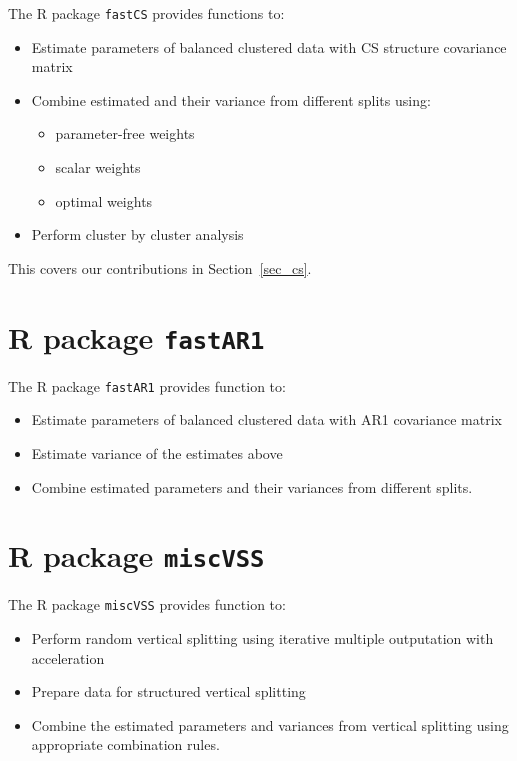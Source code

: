 \documentclass[11pt,a5paper,twoside]{book}
\begin{document}
The R package {\tt{fastCS}} provides functions to:

\begin{itemize}
\item Estimate parameters of balanced clustered data with CS structure covariance matrix 
\item Combine estimated and their variance from different splits using:
\vspace{-\topsep}
\begin{itemize}
\item parameter-free weights
\item scalar weights
\item optimal weights
\end{itemize}
\vspace{-\topsep}
\item Perform cluster by cluster analysis
\end{itemize}

This covers our contributions in Section~\ref{sec_cs}.

\section{R package {\tt{fastAR1}}}

The R package {\tt{fastAR1}} provides function to:

\begin{itemize}
\item Estimate parameters of balanced clustered data with AR1 covariance matrix
\item Estimate variance of the estimates above
\item Combine estimated parameters and their variances from different splits.
\end{itemize}

\section{R package {\tt{miscVSS}}}

The R package {\tt{miscVSS}} provides function to:

\begin{itemize}
\item Perform random vertical splitting using iterative multiple outputation with acceleration
\item Prepare data for structured vertical splitting
\item Combine the estimated parameters and variances from vertical splitting using appropriate combination rules.
\end{itemize}
\end{document}

